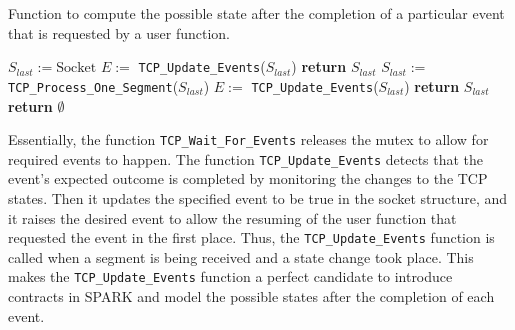 \documentclass[conference]{IEEEtran}
\def\spark#1{\lstinline[language=Ada]{#1}}
\begin{document}


\begin{algorithm}[t]
    \caption{Function to compute the possible state after the completion of a
particular event that is requested by a user function.}
\label{algo:waitForEvents}
\begin{algorithmic}[1]
\footnotesize
{}
    \State $S_{last} := \text{Socket}$
    \State $E :=$ \spark{TCP_Update_Events}($S_{last}$)
        \State \textbf{return}  $S_{last}$
    \EndIf
        \State $S_{last} :=$ \spark{TCP_Process_One_Segment}($S_{last}$)
        \State $E :=$ \spark{TCP_Update_Events}($S_{last}$)
            \State \textbf{return} $S_{last}$
        \EndIf
    \EndFor
    \State \textbf{return} $\emptyset$
\EndFunction
\end{algorithmic}
\end{algorithm}



Essentially, the function \spark{TCP_Wait_For_Events} releases the mutex to allow for required events to happen. The function \spark{TCP_Update_Events} detects that the event's expected outcome is completed by monitoring the changes to the TCP states. Then it updates the specified event to be true in the socket structure, and it raises the desired event to allow the resuming of the user function that requested the event in the first place. Thus, the \spark{TCP_Update_Events} function is called when a segment is being received and a state change took place. This makes the \spark{TCP_Update_Events} function a perfect candidate to introduce contracts in SPARK and model the possible states after the completion of each event.
\end{document}
